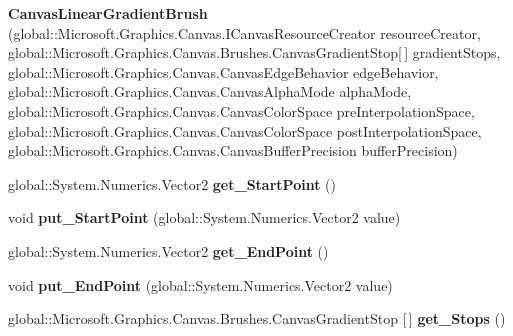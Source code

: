 \begin{DoxyCompactItemize}
{\bfseries Canvas\+Linear\+Gradient\+Brush} (global\+::\+Microsoft.\+Graphics.\+Canvas.\+I\+Canvas\+Resource\+Creator resource\+Creator, global\+::\+Microsoft.\+Graphics.\+Canvas.\+Brushes.\+Canvas\+Gradient\+Stop\mbox{[}$\,$\mbox{]} gradient\+Stops, global\+::\+Microsoft.\+Graphics.\+Canvas.\+Canvas\+Edge\+Behavior edge\+Behavior, global\+::\+Microsoft.\+Graphics.\+Canvas.\+Canvas\+Alpha\+Mode alpha\+Mode, global\+::\+Microsoft.\+Graphics.\+Canvas.\+Canvas\+Color\+Space pre\+Interpolation\+Space, global\+::\+Microsoft.\+Graphics.\+Canvas.\+Canvas\+Color\+Space post\+Interpolation\+Space, global\+::\+Microsoft.\+Graphics.\+Canvas.\+Canvas\+Buffer\+Precision buffer\+Precision)
\item 
\mbox{\label{class_microsoft_1_1_graphics_1_1_canvas_1_1_brushes_1_1_canvas_linear_gradient_brush_a2f1dcd8bc06e236375c0c79b270e53aa}} 
global\+::\+System.\+Numerics.\+Vector2 {\bfseries get\+\_\+\+Start\+Point} ()
\item 
\mbox{\label{class_microsoft_1_1_graphics_1_1_canvas_1_1_brushes_1_1_canvas_linear_gradient_brush_a52511f8d765c33e4e283bfbff7fe36b8}} 
void {\bfseries put\+\_\+\+Start\+Point} (global\+::\+System.\+Numerics.\+Vector2 value)
\item 
\mbox{\label{class_microsoft_1_1_graphics_1_1_canvas_1_1_brushes_1_1_canvas_linear_gradient_brush_ac3c3a6cf19b847fe48af885a0e9afc69}} 
global\+::\+System.\+Numerics.\+Vector2 {\bfseries get\+\_\+\+End\+Point} ()
\item 
\mbox{\label{class_microsoft_1_1_graphics_1_1_canvas_1_1_brushes_1_1_canvas_linear_gradient_brush_a62c42f4087bf4d9485a3a063483256a4}} 
void {\bfseries put\+\_\+\+End\+Point} (global\+::\+System.\+Numerics.\+Vector2 value)
\item 
\mbox{\label{class_microsoft_1_1_graphics_1_1_canvas_1_1_brushes_1_1_canvas_linear_gradient_brush_ad55e7221f7c2cd991c552a4c2189d4b6}} 
global\+::\+Microsoft.\+Graphics.\+Canvas.\+Brushes.\+Canvas\+Gradient\+Stop \mbox{[}$\,$\mbox{]} {\bfseries get\+\_\+\+Stops} ()

\end{DoxyCompactItemize}
